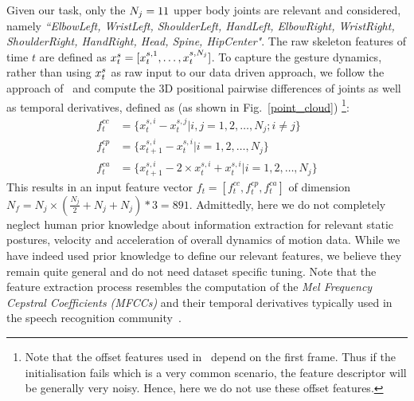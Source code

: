 Given our task, only  the $N_j=11$ upper body joints are relevant and
considered, namely \emph{``ElbowLeft, WristLeft, ShoulderLeft, HandLeft, ElbowRight, WristRight, ShoulderRight, HandRight, Head, Spine, HipCenter"}.
%
The raw skeleton features of time $t$ are defined as $x^s_t=[x_t^{s,1}, \ldots, x_t^{s, N_j}]$.
To capture the gesture dynamics, rather than using $x^s_t$ as raw input to our data driven approach,
we follow the approach of~\cite{diwucvpr14} and compute the 3D positional pairwise differences of joints as well as temporal derivatives, defined as (as shown in Fig.~\ref{point_cloud}) \footnote{Note that the offset features used in~\cite{diwucvpr14} depend on the first frame.
Thus if the initialisation fails which is a very common scenario, the feature descriptor will be generally very noisy.
Hence, here we do not use these offset features.}:
\begin{align}
f^{cc}_t&=\{x_t^{s,i}-x_t^{s,j} | i,j=1,2,\ldots, N_j; i\neq j\} \label{sk_features_1}\\
f^{cp}_t&=\{x_{t+1}^{s,i}-x_t^{s,i} |  i=1,2,\ldots, N_j\} \label{sk_features_2}\\
f^{ca}_t&=\{x_{t+1}^{s,i} - 2 \times x_t^{s,i} + x_t^{s,i} | i=1,2,\ldots, N_j  \} \label{sk_features_3}
\end{align}
%
This results in an input feature vector $f_t=[f^{cc}_t, f^{cp}_t, f^{ca}_t]$ of dimension $N_f=N_j \times( \frac{ N_j}{2} + N_j + N_j)*\mathit{3}=891$.
Admittedly, here we do not completely neglect human prior knowledge about information extraction for relevant static postures, velocity and acceleration of overall dynamics of motion data.
While we have indeed used prior knowledge to define our relevant features, we believe they remain quite general and do not need dataset specific tuning.
Note that the feature extraction process resembles the computation of the
\emph{Mel Frequency Cepstral Coefficients (MFCCs)} and their temporal derivatives
typically used in the  speech recognition community~\cite{mohamed2012acoustic}.

